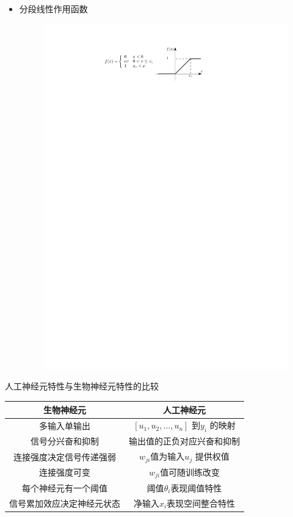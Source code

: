 \begin{itemize}
    \item 分段线性作用函数
    \begin{figure}[htbp]
        \centering
        \includegraphics{image/分段线性作用函数.pdf}
    \end{figure}
\end{itemize}
\textcolor{main1}{人工神经元特性与生物神经元特性的比较}
    \begin{table}[H]
        \centering
        \small{
        \begin{tabular}{cc}
        \toprule[1.5pt]
        生物神经元 & 人工神经元 \\
        \midrule[1pt]
        多输入单输出 & $[u_1 ,u_2 ,\dots,u_n]$ 到$y_i$ 的映射 \\
        信号分兴奋和抑制 & 输出值的正负对应兴奋和抑制 \\
        连接强度决定信号传递强弱 & $w_{ji} $值为输入$u_j$ 提供权值 \\
        连接强度可变 & $w_{ji} $值可随训练改变 \\
        每个神经元有一个阈值 & 阈值$\theta_{i}$表现阈值特性 \\
        信号累加效应决定神经元状态 & 净输入$x_i$表现空间整合特性 \\
        \bottomrule[1.5pt]
        \end{tabular}%
        }
    \end{table}%
  
